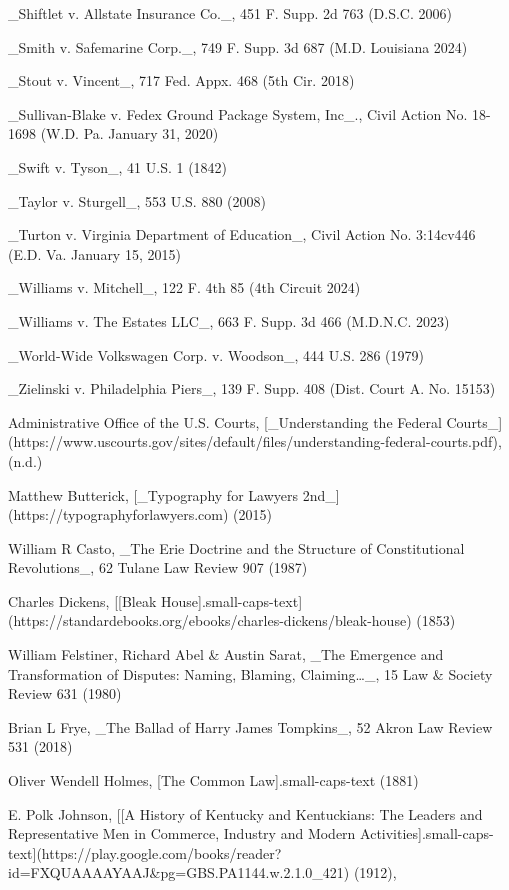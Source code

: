 _Shiftlet v. Allstate Insurance Co._, 451 F. Supp. 2d 763 (D.S.C. 2006)

_Smith v. Safemarine Corp._, 749 F. Supp. 3d 687 (M.D. Louisiana 2024)

_Stout v. Vincent_, 717 Fed. Appx. 468 (5th Cir. 2018)

_Sullivan-Blake v. Fedex Ground Package System, Inc_., Civil Action No. 18-1698 (W.D. Pa. January 31, 2020)

_Swift v. Tyson_, 41 U.S. 1 (1842)

_Taylor v. Sturgell_, 553 U.S. 880 (2008)

_Turton v. Virginia Department of Education_, Civil Action No. 3:14cv446 (E.D. Va. January 15, 2015)

_Williams v. Mitchell_, 122 F. 4th 85 (4th Circuit 2024)

_Williams v. The Estates LLC_, 663 F. Supp. 3d 466 (M.D.N.C. 2023)

_World-Wide Volkswagen Corp. v. Woodson_, 444 U.S. 286 (1979)

_Zielinski v. Philadelphia Piers_, 139 F. Supp. 408 (Dist. Court A. No. 15153)



Administrative Office of the U.S. Courts, [_Understanding the Federal Courts_](https://www.uscourts.gov/sites/default/files/understanding-federal-courts.pdf), (n.d.)

Matthew Butterick, [_Typography for Lawyers 2nd_](https://typographyforlawyers.com) (2015)

William R Casto, _The Erie Doctrine and the Structure of Constitutional Revolutions_, 62 Tulane Law Review 907 (1987)

Charles Dickens, [[Bleak House]{.small-caps-text}](https://standardebooks.org/ebooks/charles-dickens/bleak-house) (1853)

William Felstiner, Richard Abel & Austin Sarat, _The Emergence and Transformation of Disputes: Naming, Blaming, Claiming…_, 15 Law & Society Review 631 (1980)

Brian L Frye, _The Ballad of Harry James Tompkins_, 52 Akron Law Review 531 (2018)

Oliver Wendell Holmes, [The Common Law]{.small-caps-text} (1881)

E. Polk Johnson, [[A History of Kentucky and Kentuckians: The Leaders and Representative Men in Commerce, Industry and Modern Activities]{.small-caps-text}](https://play.google.com/books/reader?id=FXQUAAAAYAAJ&pg=GBS.PA1144.w.2.1.0_421) (1912), 

